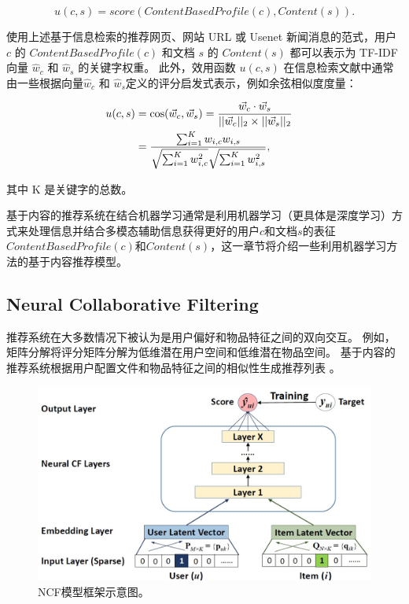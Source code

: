 \documentclass[sigconf]{acmart}
\begin{document}
\begin{equation}
  u(c, s) = score(ContentBasedProfile(c), Content(s)).
\end{equation}

使用上述基于信息检索的推荐网页、网站 URL 或 Usenet 新闻消息的范式，用户 $c$ 的 $ContentBasedProfile(c)$ 和文档 $s$ 的 $Content(s)$ 都可以表示为 TF-IDF 向量 $\hat{w}_c$ 和 $\hat{w}_s$ 的关键字权重。 此外，效用函数 $u(c,s)$ 在信息检索文献中通常由一些根据向量$\hat{w}_c$ 和 $\hat{w}_s$定义的评分启发式表示，例如余弦相似度度量：

\begin{equation}
  \begin{aligned}
    u(c, s) &= \cos (\vec w_c, \vec w_s) = {{\vec w_c \cdot \vec w_s } \over {||\vec w_c ||_2 \times ||\vec w_s ||_2 }}\cr& = {{\sum\nolimits_{i = 1}^K {w_{i, c} w_{i, s} } } \over {\sqrt {\sum\nolimits_{i = 1}^K {w_{i, c}^2 } } \sqrt {\sum\nolimits_{i = 1}^K {w_{i, s}^2 } }}},
  \end{aligned}
\end{equation}

其中 K 是关键字的总数。

基于内容的推荐系统在结合机器学习通常是利用机器学习（更具体是深度学习）方式来处理信息并结合多模态辅助信息获得更好的用户$c$和文档$s$的表征$ContentBasedProfile(c)$和$Content(s)$，这一章节将介绍一些利用机器学习方法的基于内容推荐模型。

\subsection{Neural Collaborative Filtering} 

推荐系统在大多数情况下被认为是用户偏好和物品特征之间的双向交互。 例如，矩阵分解将评分矩阵分解为低维潜在用户空间和低维潜在物品空间。 基于内容的推荐系统根据用户配置文件和物品特征之间的相似性生成推荐列表 \cite{lops2011content}。

\begin{figure}[t]
  \centering
  \includegraphics[width=\linewidth]{./img/ncf.jpg}
  \caption{NCF模型框架示意图。}
  \label{fig:ncf}
\end{figure}  
\end{document}
